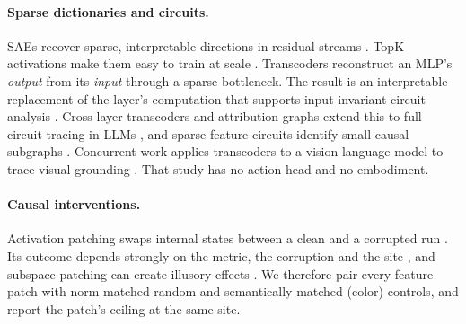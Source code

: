 \documentclass{article} %
\begin{document}
\paragraph{Sparse dictionaries and circuits.} SAEs recover sparse, interpretable directions in residual streams \citep{bricken2023monosemanticity,cunningham2024sparse}. TopK activations make them easy to train at scale \citep{gao2025scaling}. Transcoders reconstruct an MLP's \emph{output} from its \emph{input} through a sparse bottleneck. The result is an interpretable replacement of the layer's computation that supports input-invariant circuit analysis \citep{dunefsky2024transcoders}. Cross-layer transcoders and attribution graphs extend this to full circuit tracing in LLMs \citep{ameisen2025circuit,lindsey2025biology}, and sparse feature circuits identify small causal subgraphs \citep{marks2025sparse}. Concurrent work applies transcoders to a vision-language model to trace visual grounding \citep{damianos2026transcoders}. That study has no action head and no embodiment.

\paragraph{Causal interventions.} Activation patching swaps internal states between a clean and a corrupted run \citep{meng2022locating,wang2023interpretability}. Its outcome depends strongly on the metric, the corruption and the site \citep{zhang2024towards,heimersheim2024patching}, and subspace patching can create illusory effects \citep{makelov2024subspace}. We therefore pair every feature patch with norm-matched random and semantically matched (color) controls, and report the patch's ceiling at the same site.
\end{document}

